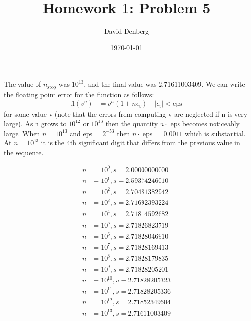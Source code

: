 \documentclass[12pt]{article}
\title{Homework 1: Problem 5}
\author{David Denberg}
\date{\today}
\begin{document}
\maketitle
The value of $n_{\mathrm{stop}}$ was $10^{13}$, and the final value was 2.71611003409. We can write the floating point error for the function as follows:
\begin{align*}
\mathrm{fl}(v^n) &= v^n(1 + n \epsilon_v) \quad	|\epsilon_v| < \mathrm{eps}
\end{align*}
for some value v (note that the errors from computing v are neglected if n is very large). As n grows to $10^{12}$ or $10^{13}$ then the quantity $n \cdot$ eps becomes noticeably large. When $n = 10^{13}$ and eps = $2^{-53}$ then $n \cdot$ eps $= 0.0011$ which is substantial. At $n = 10^{13}$ it is the 4th significant digit that differs from the previous value in the sequence.

\begin{align*}
n &= 10^0, s = 2.00000000000
\\
n &= 10^1, s = 2.59374246010
\\
n &= 10^2, s = 2.70481382942
\\
n &= 10^3, s = 2.71692393224
\\
n &= 10^4, s = 2.71814592682
\\
n &= 10^5, s = 2.71826823719
\\
n &= 10^6, s = 2.71828046910
\\
n &= 10^7, s = 2.71828169413
\\
n &= 10^8, s = 2.71828179835
\\
n &= 10^9, s = 2.71828205201
\\
n &= 10^{10}, s = 2.71828205323
\\
n &= 10^{11}, s = 2.71828205336
\\
n &= 10^{12}, s = 2.71852349604
\\
n &= 10^{13}, s = 2.71611003409
\end{align*}
\end{document}
